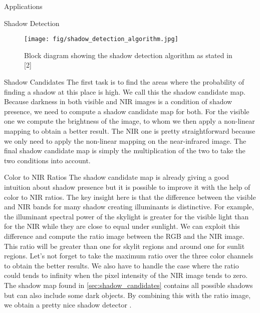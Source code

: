 \documentclass[11pt]{article}
\begin{document}
\begin{section}{Applications}
\begin{subsection}{Shadow Detection}
        \begin{figure}[!h]
            \begin{center}
                \texttt{[image: fig/shadow\_detection\_algorithm.jpg]}
                \caption{Block diagram showing the shadow detection algorithm as stated in [2]}
                \label{fig:shadow_detection_algorithm}
            \end{center}
        \end{figure}

        \begin{subsubsection}{Shadow Candidates}
            \label{sec:shadow_candidates}
            The first task is to find the areas where the probability of finding a shadow at this place is high. We call this the shadow candidate map. Because darkness in both visible and NIR images is a condition of shadow presence, we need to compute a shadow candidate map for both. For the visible one we compute the brightness of the image, to whom we then apply a non-linear mapping to obtain a better result. The NIR one is pretty straightforward because we only need to apply the non-linear mapping on the near-infrared image. The final shadow candidate map is simply the multiplication of the two to take the two conditions into account.
        \end{subsubsection}

        \begin{subsubsection}{Color to NIR Ratios}
            \label{sec:color2NIR_ratios}
            The shadow candidate map is already giving a good intuition about shadow presence but it is possible to improve it with the help of color to NIR ratios. The key insight here is that the difference between the visible and NIR bands for many shadow creating illuminants is distinctive. For example, the illuminant spectral power of the skylight is greater for the visible light than for the NIR while they are close to equal under sunlight. We can exploit this difference and compute the ratio image between the RGB and the NIR image. This ratio will be greater than one for skylit regions and around one for sunlit regions. Let's not forget to take the maximum ratio over the three color channels to obtain the better results. We also have to handle the case where the ratio could tends to infinity when the pixel intensity of the NIR image tends to zero. The shadow map found in \ref{sec:shadow_candidates} contains all possible shadows but can also include some dark objects. By combining this with the ratio image, we obtain a pretty nice shadow detector .
        \end{subsubsection}


\end{subsection}
\end{section}
\end{document}

